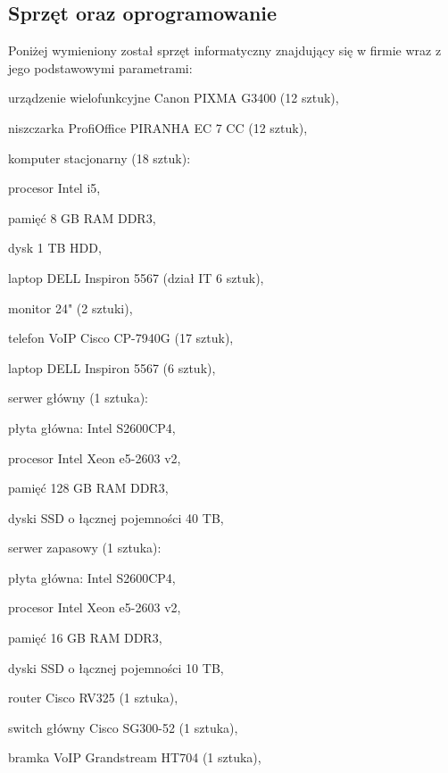 \subsection{Sprzęt oraz oprogramowanie}
Poniżej wymieniony został sprzęt informatyczny znajdujący się w firmie wraz z jego podstawowymi parametrami:
\hspace{-0.5cm}\begin{minipage}{13.5cm}
\begin{itemize*}
	\item urządzenie wielofunkcyjne Canon PIXMA G3400 (12 sztuk),
	\item niszczarka ProfiOffice PIRANHA EC 7 CC (12 sztuk),
	\item komputer stacjonarny (18 sztuk):
	\begin{itemize*}
		\item procesor Intel i5,
		\item pamięć 8 GB RAM DDR3,
		\item dysk 1 TB HDD,
	\end{itemize*}
	\item laptop DELL Inspiron 5567 (dział IT 6 sztuk),
	\item monitor 24" (2 sztuki),
	\item telefon VoIP Cisco CP-7940G (17 sztuk),
	\item laptop DELL Inspiron 5567 (6 sztuk),
	\item serwer główny (1 sztuka):
	\begin{itemize*}
		\item płyta główna: Intel S2600CP4,
		\item procesor Intel Xeon e5-2603 v2,
		\item pamięć 128 GB RAM DDR3,
		\item dyski SSD o łącznej pojemności 40 TB, 
	\end{itemize*}
	\item serwer zapasowy (1 sztuka):
	\begin{itemize*}
		\item płyta główna: Intel S2600CP4,
		\item procesor Intel Xeon e5-2603 v2,
		\item pamięć 16 GB RAM DDR3,
		\item dyski SSD o łącznej pojemności 10 TB, 
	\end{itemize*}
	\item router Cisco RV325 (1 sztuka),
	\item switch główny Cisco SG300-52 (1 sztuka),
	\item bramka VoIP Grandstream HT704 (1 sztuka),

\end{itemize*}
\end{minipage}
